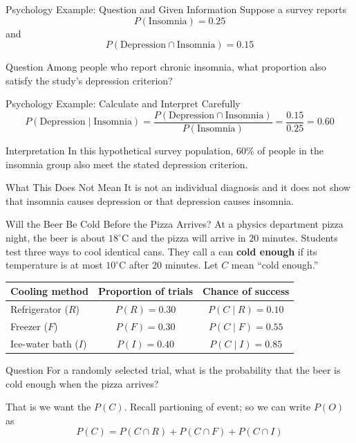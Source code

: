 \documentclass[aspectratio=169]{beamer}
\begin{document}
\begin{frame}{Psychology Example: Question and Given Information}
Suppose a survey reports
$$P(\text{Insomnia})=0.25$$
and
$$P(\text{Depression}\cap\text{Insomnia})=0.15$$

\begin{block}{Question}
Among people who report chronic insomnia, what proportion also satisfy the study's depression criterion?
\end{block}
\end{frame}

\begin{frame}{Psychology Example: Calculate and Interpret Carefully}
\[
	P(\text{Depression}\mid\text{Insomnia}) =\frac{P(\text{Depression}\cap\text{Insomnia})}{P(\text{Insomnia})} =\frac{0.15}{0.25} =\mathbf{0.60}
\]

\begin{block}{Interpretation}
In this hypothetical survey population, 60\% of people in the insomnia group also meet the stated depression criterion.
\end{block}

\begin{alertblock}{What This Does Not Mean}
It is not an individual diagnosis and it does not show that insomnia causes depression or that depression causes insomnia.
\end{alertblock}
\end{frame}

\begin{frame}{Will the Beer Be Cold Before the Pizza Arrives?}
At a physics department pizza night, the beer is about $18^\circ$C and the pizza will arrive in $20$ minutes. Students test three ways to cool identical cans. They call a can \textbf{cold enough} if its temperature is at most $10^\circ$C after $20$ minutes. Let $C$ mean ``cold enough.''

\begin{table}
\centering
\small
\begin{tabular}{lcc}
\toprule
\textbf{Cooling method} & \textbf{Proportion of trials} & \textbf{Chance of success} \\
\midrule
Refrigerator ($R$) & $P(R)=0.30$ & $P(C\mid R)=0.10$ \\
Freezer ($F$)      & $P(F)=0.30$ & $P(C\mid F)=0.55$ \\
Ice-water bath ($I$)& $P(I)=0.40$ & $P(C\mid I)=0.85$ \\
\bottomrule
\end{tabular}
\end{table}

\begin{block}{Question}
For a randomly selected trial, what is the probability that the beer is cold enough when the pizza arrives?
\end{block}

That is we want the $P(C)$. Recall partioning of event; so we can write $P(O)$ as 
$$P(C) = P(C \cap R) + P(C \cap F) + P(C \cap I)$$
\end{frame}
\end{document}

